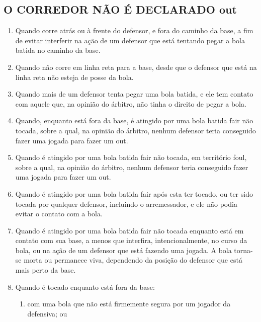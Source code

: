 \begin{multicols}{2}
	\subsection{O CORREDOR N\~AO \'E DECLARADO \gls{out}} 
	
	\begin{enumerate}[label=\alph*)]
		\item Quando corre atr\'as ou \`a frente do defensor, e fora do caminho da base, a fim de evitar interferir na a\c{c}\~ao de um defensor que est\'a tentando pegar a bola batida no caminho da base. 
		
		\item  Quando n\~ao corre em linha reta para a base, desde que o defensor que est\'a na linha reta n\~ao esteja de posse da bola. 
		
		\item  Quando mais de um defensor tenta pegar uma bola batida, e ele tem contato com aquele que, na opini\~ao do \'arbitro, n\~ao tinha o direito de pegar a bola. 
		
		\item  Quando, enquanto est\'a fora da base, \'e atingido por uma bola batida \gls{fair} n\~ao tocada, sobre a qual, na opini\~ao do \'arbitro, nenhum defensor teria conseguido fazer uma jogada para fazer um \gls{out}. 
		
		\item  Quando \'e atingido por uma bola batida \gls{fair} n\~ao tocada, em territ\'orio \gls{foul}, sobre a qual, na opini\~ao do \'arbitro, nenhum defensor teria conseguido fazer uma jogada para fazer um \gls{out}.
		\item Quando \'e atingido por uma bola batida \gls{fair} ap\'os esta ter tocado, ou ter sido tocada por qualquer defensor, incluindo o arremessador, e ele n\~ao podia evitar o contato com a bola. 
		
		\item  Quando \'e atingido por uma bola batida \gls{fair} n\~ao tocada enquanto est\'a em contato com sua base, a menos que interfira, intencionalmente, no curso da bola, ou na a\c{c}\~ao de um defensor que est\'a fazendo uma jogada. A bola torna-se morta ou permanece 
		viva, dependendo da posi\c{c}\~ao do defensor que est\'a mais perto da base. 
		
		\item  Quando \'e tocado enquanto est\'a fora da base: 
		\begin{enumerate}[label = \arabic*)]
			\item com uma bola que n\~ao est\'a firmemente segura por um jogador da defensiva; ou 
			

\end{enumerate}
\end{enumerate}
\end{multicols}
